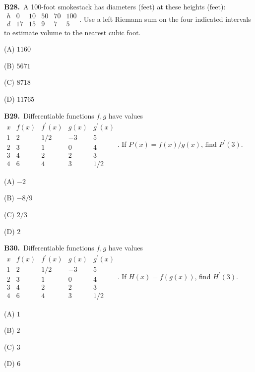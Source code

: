 \documentclass[11pt]{article}
\begin{document}
\bigskip\noindent\textbf{B28.}\ A 100-foot smokestack has diameters (feet) at these heights (feet): $\begin{array}{c|rrrrr}h&0&10&50&70&100\\d&17&15&9&7&5\end{array}$. Use a left Riemann sum on the four indicated intervals to estimate volume to the nearest cubic foot.
\begin{list}{}{\setlength{\leftmargin}{3em}\setlength{\labelwidth}{2.5em}\setlength{\itemsep}{0pt}\setlength{\topsep}{2pt}}
\item[(A)] $1160$
\item[(B)] $5671$
\item[(C)] $8718$
\item[(D)] $11765$
\end{list}

\bigskip\noindent\textbf{B29.}\ Differentiable functions $f,g$ have values $\begin{array}{c|rrrr}x&f(x)&f^{\prime}(x)&g(x)&g^{\prime}(x)\\1&2&1/2&-3&5\\2&3&1&0&4\\3&4&2&2&3\\4&6&4&3&1/2\end{array}$. If $P(x)=f(x)/g(x)$, find $P^{\prime}(3)$.
\begin{list}{}{\setlength{\leftmargin}{3em}\setlength{\labelwidth}{2.5em}\setlength{\itemsep}{0pt}\setlength{\topsep}{2pt}}
\item[(A)] $-2$
\item[(B)] $-8/9$
\item[(C)] $2/3$
\item[(D)] $2$
\end{list}

\bigskip\noindent\textbf{B30.}\ Differentiable functions $f,g$ have values $\begin{array}{c|rrrr}x&f(x)&f^{\prime}(x)&g(x)&g^{\prime}(x)\\1&2&1/2&-3&5\\2&3&1&0&4\\3&4&2&2&3\\4&6&4&3&1/2\end{array}$. If $H(x)=f(g(x))$, find $H^{\prime}(3)$.
\begin{list}{}{\setlength{\leftmargin}{3em}\setlength{\labelwidth}{2.5em}\setlength{\itemsep}{0pt}\setlength{\topsep}{2pt}}
\item[(A)] $1$
\item[(B)] $2$
\item[(C)] $3$
\item[(D)] $6$
\end{list}
\end{document}
